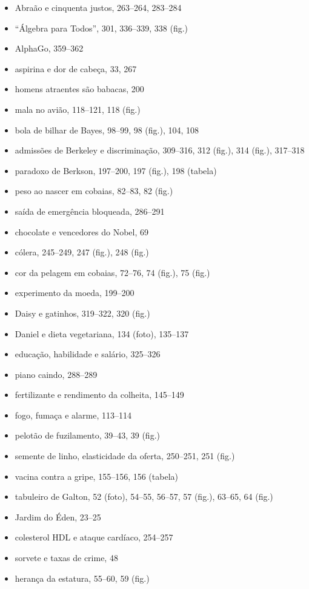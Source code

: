 \documentclass[11pt,a5paper,twoside]{book}
\begin{document}
\begin{itemize}
\item Abraão e cinquenta justos, 263–264, 283–284
\item “Álgebra para Todos”, 301, 336–339, 338 (fig.)
\item AlphaGo, 359–362
\item aspirina e dor de cabeça, 33, 267
\item homens atraentes são babacas, 200
\item mala no avião, 118–121, 118 (fig.)
\item bola de bilhar de Bayes, 98–99, 98 (fig.), 104, 108
\item admissões de Berkeley e discriminação, 309–316, 312 (fig.), 314 (fig.), 317–318
\item paradoxo de Berkson, 197–200, 197 (fig.), 198 (tabela)
\item peso ao nascer em cobaias, 82–83, 82 (fig.)
\item saída de emergência bloqueada, 286–291
\item chocolate e vencedores do Nobel, 69
\item cólera, 245–249, 247 (fig.), 248 (fig.)
\item cor da pelagem em cobaias, 72–76, 74 (fig.), 75 (fig.)
\item experimento da moeda, 199–200
\item Daisy e gatinhos, 319–322, 320 (fig.)
\item Daniel e dieta vegetariana, 134 (foto), 135–137
\item educação, habilidade e salário, 325–326
\item piano caindo, 288–289
\item fertilizante e rendimento da colheita, 145–149
\item fogo, fumaça e alarme, 113–114
\item pelotão de fuzilamento, 39–43, 39 (fig.)
\item semente de linho, elasticidade da oferta, 250–251, 251 (fig.)
\item vacina contra a gripe, 155–156, 156 (tabela)
\item tabuleiro de Galton, 52 (foto), 54–55, 56–57, 57 (fig.), 63–65, 64 (fig.)
\item Jardim do Éden, 23–25
\item colesterol HDL e ataque cardíaco, 254–257
\item sorvete e taxas de crime, 48
\item herança da estatura, 55–60, 59 (fig.)

\end{itemize}
\end{document}
